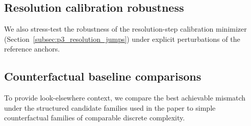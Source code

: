 \subsection{Resolution calibration robustness}
\label{app:audit_resolution_calibration}

We also stress-test the robustness of the resolution-step calibration minimizer (Section~\ref{subsec:p3_resolution_jumps}) under explicit perturbations of the reference anchors.

\begin{table}[H]
\centering
\scriptsize
\setlength{\tabcolsep}{6pt}
\renewcommand{\arraystretch}{1.15}
%
\caption{Minimizer stability rates for the resolution-step calibration under sampled anchor perturbations. Rows are generated by \texttt{scripts/exp\_audit\_resolution\_calibration\_robustness.py}.}
\label{tab:audit_resolution_calibration_robustness}
\end{table}

\subsection{Counterfactual baseline comparisons}
\label{app:audit_counterfactual}

To provide look-elsewhere context, we compare the best achievable mismatch under the structured candidate families used in the paper to simple counterfactual families of comparable discrete complexity.

\begin{table}[H]
\centering
\scriptsize
\setlength{\tabcolsep}{6pt}
\renewcommand{\arraystretch}{1.15}
%
\caption{Counterfactual baseline comparisons for selected closures. Rows are generated by \texttt{scripts/exp\_audit\_counterfactual\_baselines.py}.}
\label{tab:audit_counterfactual}
\end{table}

